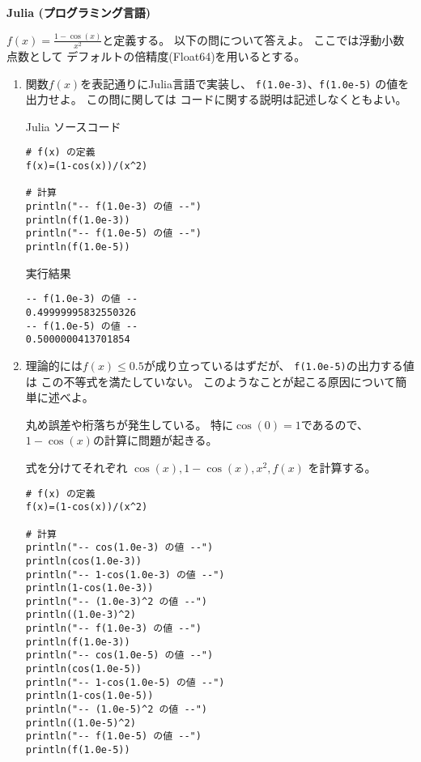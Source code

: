 \documentclass[12pt,b5paper]{ltjsarticle}
\begin{document}
\hrulefill

\textbf{Julia (プログラミング言語)}

$\displaystyle f(x)=\frac{1-\cos{(x)}}{x^2}$と定義する。
以下の問について答えよ。
ここでは浮動小数点数として
デフォルトの倍精度(Float64)を用いるとする。

\dotfill

\begin{enumerate}
 \item
      関数$f(x)$を表記通りにJulia言語で実装し、
      \texttt{f(1.0e-3)}、\texttt{f(1.0e-5)}
      の値を出力せよ。
      この問に関しては
      コードに関する説明は記述しなくともよい。

      \dotfill

      
      Julia ソースコード
      \begin{lstlisting}
# f(x) の定義
f(x)=(1-cos(x))/(x^2)

# 計算
println("-- f(1.0e-3) の値 --")
println(f(1.0e-3))
println("-- f(1.0e-5) の値 --")
println(f(1.0e-5))
      \end{lstlisting}

      実行結果
      \begin{lstlisting}
-- f(1.0e-3) の値 --
0.49999995832550326
-- f(1.0e-5) の値 --
0.5000000413701854
      \end{lstlisting}

      \hrulefill

 \item
      理論的には$f(x)\leq 0.5$が成り立っているはずだが、
      \texttt{f(1.0e-5)}の出力する値は
      この不等式を満たしていない。
      このようなことが起こる原因について簡単に述べよ。

      \dotfill

      丸め誤差や桁落ちが発生している。
      特に$\cos{(0)}=1$であるので、
      $1-\cos{(x)}$の計算に問題が起きる。
      
      式を分けてそれぞれ
      $\cos{(x)},1-\cos{(x)},x^2,f(x)$
      を計算する。
      \begin{lstlisting}
# f(x) の定義
f(x)=(1-cos(x))/(x^2)

# 計算
println("-- cos(1.0e-3) の値 --")
println(cos(1.0e-3))
println("-- 1-cos(1.0e-3) の値 --")
println(1-cos(1.0e-3))
println("-- (1.0e-3)^2 の値 --")
println((1.0e-3)^2)
println("-- f(1.0e-3) の値 --")
println(f(1.0e-3))
println("-- cos(1.0e-5) の値 --")
println(cos(1.0e-5))
println("-- 1-cos(1.0e-5) の値 --")
println(1-cos(1.0e-5))
println("-- (1.0e-5)^2 の値 --")
println((1.0e-5)^2)
println("-- f(1.0e-5) の値 --")
println(f(1.0e-5))
      \end{lstlisting}


\end{enumerate}
\end{document}
